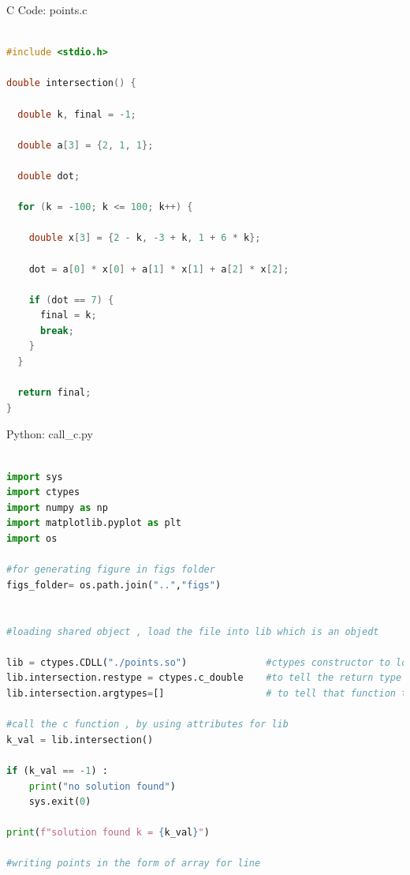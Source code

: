 \documentclass{beamer}
\numberwithin{equation}{section}
\theoremstyle{remark}
\begin{document}
\begin{frame}[fragile]{C Code: points.c}
\begin{lstlisting}[language=C]

#include <stdio.h>

double intersection() {

  double k, final = -1;

  double a[3] = {2, 1, 1};

  double dot;

  for (k = -100; k <= 100; k++) {

    double x[3] = {2 - k, -3 + k, 1 + 6 * k};

    dot = a[0] * x[0] + a[1] * x[1] + a[2] * x[2];

    if (dot == 7) {
      final = k;
      break;
    }
  }

  return final;
}

\end{lstlisting}
\end{frame}

\begin{frame}[fragile]{Python: call\_c.py}
\begin{lstlisting}[language=Python]

import sys
import ctypes
import numpy as np
import matplotlib.pyplot as plt
import os

#for generating figure in figs folder
figs_folder= os.path.join("..","figs")


#loading shared object , load the file into lib which is an objedt

lib = ctypes.CDLL("./points.so")              #ctypes constructor to load a shared c library
lib.intersection.restype = ctypes.c_double    #to tell the return type is a c double
lib.intersection.argtypes=[]                  # to tell that function takes no arguments

#call the c function , by using attributes for lib
k_val = lib.intersection()

if (k_val == -1) :
    print("no solution found")
    sys.exit(0)

print(f"solution found k = {k_val}")

#writing points in the form of array for line

\end{lstlisting}
\end{frame}
\end{document}
